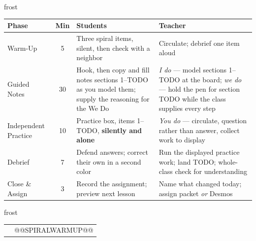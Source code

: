 \documentclass[10pt]{article}
\begin{document}
\begin{fixedskillbox}{frost}
\renewcommand{\arraystretch}{1.25}
\begin{tabularx}{\linewidth}{@{}l c X X@{}}
\textbf{Phase} & \textbf{Min} & \textbf{Students} & \textbf{Teacher} \\
\hline
Warm-Up & 5 & Three spiral items, silent, then check with a neighbor & Circulate; debrief one item aloud \\
Guided Notes & 30 & Hook, then copy and fill notes sections 1--TODO as you model them; supply the reasoning for the We Do & \emph{I do} --- model sections 1--TODO at the board; \emph{we do} --- hold the pen for section TODO while the class supplies every step \\
Independent Practice & 10 & Practice box, items 1--TODO, \textbf{silently and alone} & \emph{You do} --- circulate, question rather than answer, collect work to display \\
Debrief & 7 & Defend answers; correct their own in a second color & Run the displayed practice work; land TODO; whole-class check for understanding \\
Close \& Assign & 3 & Record the assignment; preview next lesson & Name what changed today; assign packet \emph{or} Desmos \\
\end{tabularx}
\end{fixedskillbox}

\begin{fixedskillbox}{frost}
    \begin{tabularx}{\linewidth}{@{}X c@{}}
        \begin{minipage}[t]{0.55\linewidth}\vspace{0pt}
        \end{minipage}
        &
        \begin{minipage}[t]{0.38\linewidth}\vspace{0pt}\centering
@@SPIRALWARMUP@@
        \end{minipage}
    \end{tabularx}
\end{fixedskillbox}
\end{document}
